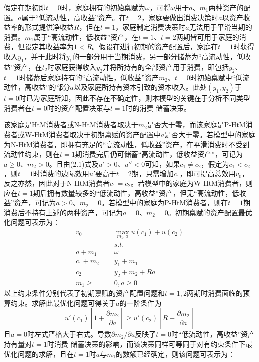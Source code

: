 \documentclass[supercite]{HustGraduPaper}
\begin{document}
    假定在期初即$t=0$时，家庭拥有的初始禀赋为$\omega$，可将$\omega$用于$a$、$m_1$两种资产的配置。$a$属于“低流动性，高收益”资产。在$t=2$，家庭要做出消费决策时$a$以资产收益率的形式提供净收益$R$，但在$t=1$，家庭制定消费决策时$a$无法用于平滑当期的消费。$m_1$属于“高流动性，低收益”资产，在$t=1$、$t=2$两期皆可用于家庭的消费，但设定其收益率为$1<R$。假设在进行初期的资产配置后，家庭在$t=1$时获得收入$y_1$，并于此时将$y_1$的一部分用于当期消费，另一部分储蓄为“高流动性，低收益”资产，在$t_2$时家庭获得收入$y_2$并将所持有的全部资产用于消费，即包括$y_2$、$t=1$时储蓄后家庭持有的“高流动性，低收益”资产$m_2$、$t=0$时初始禀赋中“低流动性，高收益”的部分$a$以及家庭所持有资本引致的资本收入。此处$(y_1,y_2)$于$t=0$时已为家庭所知，因此不存在不确定性，则本模型的关键在于分析不同类型消费者在$t=0$时的资产配置决策与$t=1$时的消费-储蓄决策。

    该家庭是HtM消费者或N-HtM消费者取决于$m_2$是否大于零，而该家庭是P-HtM消费者或W-HtM消费者取决于初期禀赋的资产配置中$a$是否大于零。若模型中的家庭为N-HtM消费者，即拥有充足的“高流动性，低收益”资产，在平滑消费时不受到流动性约束，则在$t=1$期消费完后仍可储蓄“高流动性，低收益资产”，可记为$a \geq 0$、$m_2>0$。且由(2.1)式及$u'>0$、$u''<0$可知，如果$c_1 \neq c_2$，假定为$c_1<c_2$，则$t=1$时消费的边际效用$u'$要高于$t=2$期，只需增加$c_1$，即可提高总效用$v_0$，反之亦然，因此对于N-HtM消费者$c_1=c_2$。若模型中的家庭为W-HtM消费者，则应在$t=1$期后拥有数量较多的“低流动性，高收益”资产，但无“高流动性，低收益”资产，可记为$a>0$、$m_2=0$。若模型中的家庭为P-HtM消费者，则在$t=1$期消费后不持有上述的两种资产，可记为$a=0$、$m_2=0$。初期禀赋的资产配置最优化问题可表示为：
    \begin{align*} 
    v_0= & \max_{m_1,a} u(c_1)+u(c_2)\\
    & s.t.\\
    a+m_1= & \omega\\
    c_1+m_2= & y_1+m_1\\
    c_2= & y_2+m_2+Ra\\
    m_1 \geq & 0,a \geq 0 
    \end{align*}
    以上约束条件分别代表了初期禀赋的资产配置问题和$t=1,2$两期时消费面临的预算约束。求解此最优化问题可得关于$a$的一阶条件为
    \begin{equation}
    u'(c_1)[1+\frac{\partial m_2}{\partial a}] \geq u'(c_2)[R+\frac{\partial m_2}{\partial a}]
    \end{equation}
    且$a=0$时左式严格大于右式。导数${\partial m_2}/{\partial a}$反映了$t=0$时“低流动性，高收益”资产持有量对$t=1$时消费-储蓄决策的影响，而该决策同样可等同于对有约束条件下最优化问题的求解，且在$t=1$时$a$与$m_1$的数额已经确定，则该问题可表示为：
\end{document}
